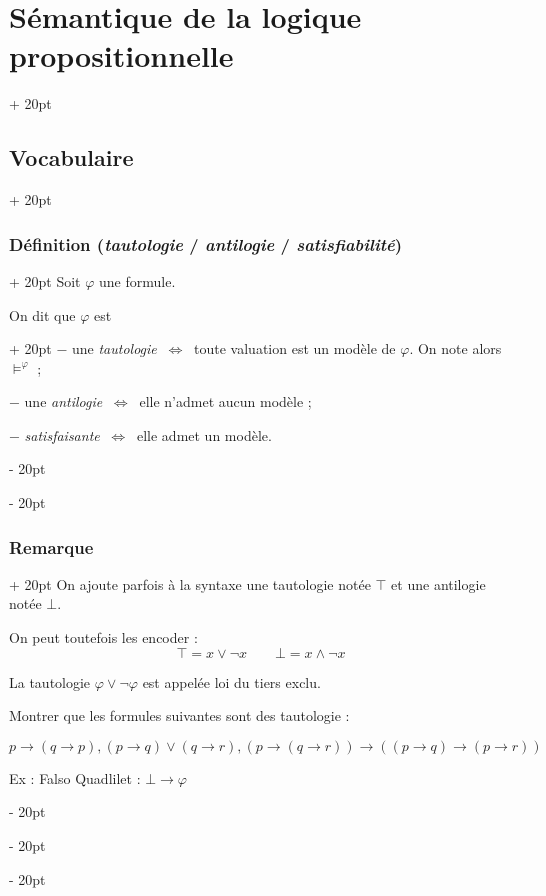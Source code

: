 \documentclass[a4paper, 12pt, twoside]{article}
\newcommand{\ssi}{\ \Leftrightarrow \ }
\newcommand{\ind}[1][20pt]{\advance\leftskip + #1}
\newcommand{\deind}[1][20pt]{\advance\leftskip - #1}
\newenvironment{indt}[2][20pt]{#2 \par \ind[#1]}{\par \deind} %
\begin{document}
\begin{indt}{\section{Sémantique de la logique propositionnelle}}
\begin{indt}{\subsection{Vocabulaire}}
            \begin{indt}{\subsubsection{Définition (\textit{tautologie} / \textit{antilogie} / \textit{satisfiabilité})}}
                Soit $\varphi$ une formule.
                
                \begin{indt}{On dit que $\varphi$ est}
                    $-$ une \textit{tautologie} $\ssi$ toute valuation est un modèle de $\varphi$. On note alors $\vDash^\varphi$ ;
                    
                    $-$ une \textit{antilogie} $\ssi$ elle n'admet aucun modèle ;
                    
                    $-$ \textit{satisfaisante} $\ssi$ elle admet un modèle.
                \end{indt}
            \end{indt}
            
            \vspace{12pt}
            
            \begin{indt}{\subsubsection{Remarque}}
                On ajoute parfois à la syntaxe une tautologie notée $\top$ et une antilogie notée $\bot$.
                
                On peut toutefois les encoder :
                    \[ \top = x \vee \neg x \qquad \bot = x \wedge \neg x \]
                
                La tautologie $\varphi \vee \neg \varphi$ est appelée loi du tiers exclu.
                
                 Montrer que les formules suivantes sont des tautologie :
                
                $p \rightarrow (q \rightarrow p), (p \rightarrow q) \vee (q \rightarrow r), (p \rightarrow (q \rightarrow r)) \rightarrow ((p \rightarrow q) \rightarrow (p \rightarrow r))$
                
                \vspace{12pt}
                
                Ex : Falso Quadlilet : $\bot \rightarrow \varphi$
                

\end{indt}
\end{indt}
\end{indt}
\end{document}
